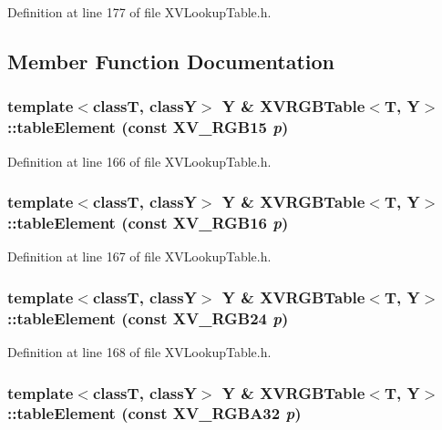Definition at line 177 of file XVLookup\-Table.h.

\subsection{Member Function Documentation}
\label{XVRGBTable_b1}
\hypertarget{class_XVRGBTable_b1}{
\subsubsection[tableElement]{\setlength{\rightskip}{0pt plus 5cm}template$<$classT, classY$>$ Y \& XVRGBTable$<$T, Y$>$::table\-Element (const XV\_\-RGB15 {\em p})}}




Definition at line 166 of file XVLookup\-Table.h.\label{XVRGBTable_b2}
\hypertarget{class_XVRGBTable_b2}{
\subsubsection[tableElement]{\setlength{\rightskip}{0pt plus 5cm}template$<$classT, classY$>$ Y \& XVRGBTable$<$T, Y$>$::table\-Element (const XV\_\-RGB16 {\em p})}}




Definition at line 167 of file XVLookup\-Table.h.\label{XVRGBTable_b3}
\hypertarget{class_XVRGBTable_b3}{
\subsubsection[tableElement]{\setlength{\rightskip}{0pt plus 5cm}template$<$classT, classY$>$ Y \& XVRGBTable$<$T, Y$>$::table\-Element (const XV\_\-RGB24 {\em p})}}




Definition at line 168 of file XVLookup\-Table.h.\label{XVRGBTable_b4}
\hypertarget{class_XVRGBTable_b4}{
\subsubsection[tableElement]{\setlength{\rightskip}{0pt plus 5cm}template$<$classT, classY$>$ Y \& XVRGBTable$<$T, Y$>$::table\-Element (const XV\_\-RGBA32 {\em p})}}




